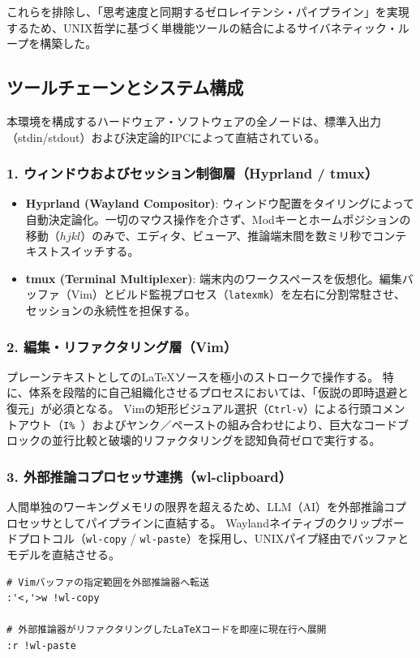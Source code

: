 これらを排除し、「思考速度と同期するゼロレイテンシ・パイプライン」を実現するため、UNIX哲学に基づく単機能ツールの結合によるサイバネティック・ループを構築した。

\subsection{ツールチェーンとシステム構成}
本環境を構成するハードウェア・ソフトウェアの全ノードは、標準入出力（stdin/stdout）および決定論的IPCによって直結されている。

\subsubsection{1. ウィンドウおよびセッション制御層（Hyprland / tmux）}
\begin{itemize}
    \item \textbf{Hyprland (Wayland Compositor)}:
    ウィンドウ配置をタイリングによって自動決定論化。一切のマウス操作を介さず、Modキーとホームポジションの移動（$hjkl$）のみで、エディタ、ビューア、推論端末間を数ミリ秒でコンテキストスイッチする。
    \item \textbf{tmux (Terminal Multiplexer)}:
    端末内のワークスペースを仮想化。編集バッファ（Vim）とビルド監視プロセス（\texttt{latexmk}）を左右に分割常駐させ、セッションの永続性を担保する。
\end{itemize}

\subsubsection{2. 編集・リファクタリング層（Vim）}
プレーンテキストとしてのLaTeXソースを極小のストロークで操作する。
特に、体系を段階的に自己組織化させるプロセスにおいては、「仮説の即時退避と復元」が必須となる。
Vimの矩形ビジュアル選択（\texttt{Ctrl-v}）による行頭コメントアウト（\texttt{I\% }）およびヤンク／ペーストの組み合わせにより、巨大なコードブロックの並行比較と破壊的リファクタリングを認知負荷ゼロで実行する。

\subsubsection{3. 外部推論コプロセッサ連携（wl-clipboard）}
人間単独のワーキングメモリの限界を超えるため、LLM（AI）を外部推論コプロセッサとしてパイプラインに直結する。
Waylandネイティブのクリップボードプロトコル（\texttt{wl-copy} / \texttt{wl-paste}）を採用し、UNIXパイプ経由でバッファとモデルを直結させる。

\begin{verbatim}
# Vimバッファの指定範囲を外部推論器へ転送
:'<,'>w !wl-copy

# 外部推論器がリファクタリングしたLaTeXコードを即座に現在行へ展開
:r !wl-paste
\end{verbatim}

